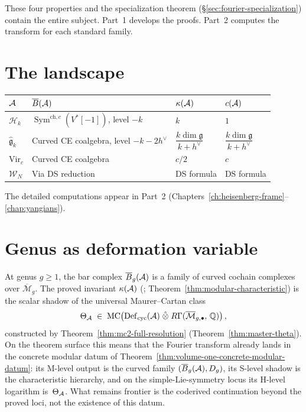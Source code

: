 \begin{remark}\label{rem:fourier-scope}
These four properties and the specialization theorem
(\S\ref{sec:fourier-specialization}) contain the entire subject.
Part~1 develops the proofs.  Part~2 computes the transform for each
standard family.
\end{remark}


\section{The landscape}\label{sec:fourier-landscape}

\begin{center}
\small
\begin{tabular}{llll}
\textbf{$\mathcal{A}$}
  & \textbf{$\overline{B}(\mathcal{A})$}
  & \textbf{$\kappa(\mathcal{A})$}
  & \textbf{$c(\mathcal{A})$} \\
\hline
$\mathcal{H}_k$
  & $\operatorname{Sym}^{\mathrm{ch},c}(V^*[-1])$, level $-k$
  & $k$
  & $1$ \\[2pt]
$\widehat{\mathfrak{g}}_k$
  & Curved CE coalgebra, level $-k - 2h^\vee$
  & $\dfrac{k\dim\mathfrak{g}}{k + h^\vee}$
  & $\dfrac{k\dim\mathfrak{g}}{k + h^\vee}$ \\[6pt]
$\mathrm{Vir}_c$
  & Curved CE coalgebra
  & $c/2$
  & $c$ \\[2pt]
$\mathcal{W}_N$
  & Via DS reduction
  & DS formula
  & DS formula
\end{tabular}
\end{center}

\noindent
The detailed computations appear in Part~2
(Chapters~\ref{ch:heisenberg-frame}--\ref{chap:yangians}).


\section{Genus as deformation variable}\label{sec:fourier-genus}

\begin{remark}
\label{rem:fourier-genus-preview}
At genus $g \geq 1$, the bar complex $\overline{B}_g(\mathcal{A})$ is a family of
curved cochain complexes over $\overline{\mathcal{M}}_g$.  The proved
invariant $\kappa(\mathcal{A})$ (\ClaimStatusProvedHere;
Theorem~\ref{thm:modular-characteristic}) is the scalar shadow of the
universal Maurer--Cartan class
\begin{equation}\label{eq:fourier-theta-preview}
\Theta_{\mathcal{A}} \;\in\;
\mathrm{MC}\!\left(
  \operatorname{Def}_{\mathrm{cyc}}(\mathcal{A}) \;\hat{\otimes}\;
  R\Gamma(\overline{\mathcal{M}}_{g,\bullet},\, \mathbb{Q})
\right),
\end{equation}
constructed by Theorem~\ref{thm:mc2-full-resolution}
(Theorem~\ref{thm:master-theta}).
On the theorem surface this means that the Fourier transform already
lands in the concrete modular datum of
Theorem~\ref{thm:volume-one-concrete-modular-datum}: its M-level
output is the curved family $(\overline{B}_g(\mathcal{A}), D_{g})$, its S-level
shadow is the characteristic hierarchy, and on the simple-Lie-symmetry
locus its H-level logarithm is~$\Theta_{\mathcal{A}}$.  What remains frontier
is the coderived continuation beyond the proved loci, not the
existence of this datum.
\end{remark}
